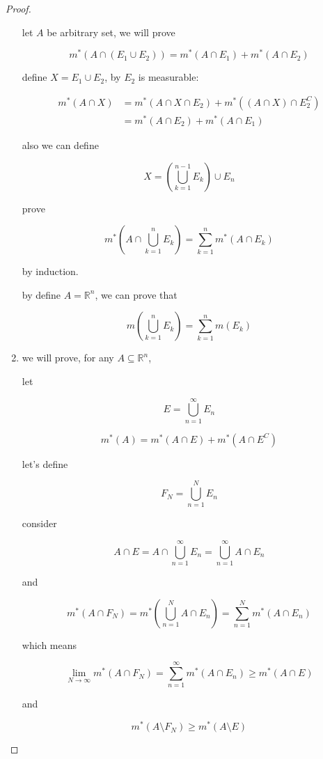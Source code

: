 \begin{proof}
\begin{enumerate}
    let $A$ be arbitrary set, we will prove

    \[
        m^*\left( A \cap \left( E_1 \cup E_2\right) \right) = m^*(A \cap E_1) + m^*(A \cap E_2)
    \]

    define $X = E_1 \cup E_2$, by $E_2$ is measurable:

    \begin{align}
        m^*(A \cap X) &= m^*( A \cap X \cap E_2) + m^*( (A \cap X) \cap E_2^C) \\
        &= m^*(A \cap E_2)  + m^*(A \cap E_1)
    \end{align}

    also we can define 

    \[
        X = \left(\bigcup_{k=1}^{n-1}E_k \right) \cup E_n
    \]

    prove

    \[
        m^*\left(A \cap \bigcup_{k=1}^{n}E_k\right) = \sum_{k=1}^{n}m^*(A \cap E_k)
    \]

    by induction.

    by define $A = \mathbb{R}^n$, we can prove that

    \[
        m\left(\bigcup_{k=1}^{n}E_k\right) = \sum_{k=1}^{n} m(E_k)
    \]

    \item we will prove, for any $A \subseteq \mathbb{R}^n$,

    let 

    \[
        E = \bigcup_{n=1}^{\infty}E_n
    \]
    
    \[
        m^*(A) = m^*(A \cap E) + m^*(A \cap E^C)
    \]

    let's define 

    \[
        F_N = \bigcup_{n=1}^{N}E_n
    \]

    consider

    \[
        A \cap E = A \cap \bigcup_{n=1}^{\infty}E_n  = \bigcup_{n=1}^{\infty} A \cap E_n
    \]

    and

    \[
        m^*\left(A \cap F_N \right) = m^*\left(\bigcup_{n=1}^{N} A \cap E_n \right) = \sum_{n=1}^{N}m^*(A \cap E_n)
    \]

    which means

    \[
        \lim_{N \to \infty}m^*(A \cap F_N) = \sum_{n=1}^{\infty}m^*(A \cap E_n) \ge m^*(A \cap E)
    \]

    and

    \[
        m^*(A \setminus F_N) \ge m^*(A \setminus E)
    \]


\end{enumerate}
\end{proof}
